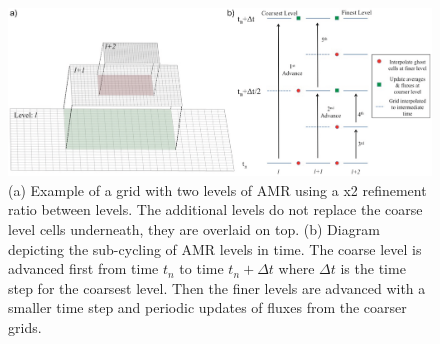 \begin{figure}
    \centerline{%
    \noindent
    \includegraphics[width=\textwidth]{Chap1/subcyles_and_levels_h.eps}}
    \caption{(a) Example of a grid with two levels of AMR using a x2
    refinement ratio between levels.  The additional levels do not
    replace the coarse level cells underneath, they are overlaid on top.
    (b) Diagram depicting the sub-cycling of AMR levels in time.  The
    coarse level is advanced first from time $t_n$ to time $t_n +\Delta t$ where $\Delta t$ is the time step for the coarsest level. Then the finer levels are advanced
    with a smaller time step and periodic updates of fluxes from the
    coarser grids.}%
    \label{fig:cyclesnlevels}
\end{figure}

